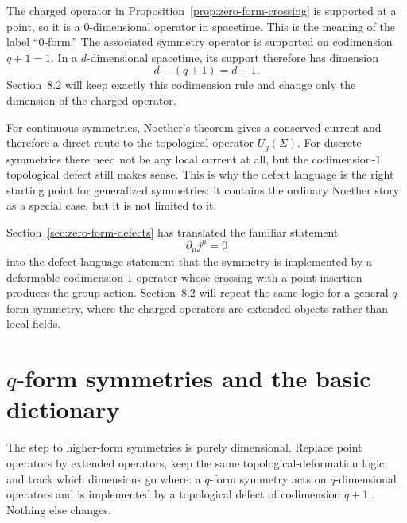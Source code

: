 \begin{remark}\label{rem:why-zero-form}
The charged operator in Proposition~\ref{prop:zero-form-crossing} is supported at a point, so it is a $0$-dimensional operator in spacetime. This is the meaning of the label ``$0$-form.'' The associated symmetry operator is supported on codimension $q+1=1$. In a $d$-dimensional spacetime, its support therefore has dimension
\begin{equation*}
d-(q+1)=d-1.
\end{equation*}
Section~8.2 will keep exactly this codimension rule and change only the dimension of the charged operator.
\end{remark}

\begin{remark}\label{rem:noether-vs-defect}
For continuous symmetries, Noether's theorem gives a conserved current and therefore a direct route to the topological operator $U_g(\Sigma)$. For discrete symmetries there need not be any local current at all, but the codimension-$1$ topological defect still makes sense. This is why the defect language is the right starting point for generalized symmetries: it contains the ordinary Noether story as a special case, but it is not limited to it.
\end{remark}

\begin{remark}\label{rem:zero-form-forward}
Section~\ref{sec:zero-form-defects} has translated the familiar statement
\begin{equation*}
\partial_\mu j^\mu = 0
\end{equation*}
into the defect-language statement that the symmetry is implemented by a deformable codimension-$1$ operator whose crossing with a point insertion produces the group action. Section~8.2 will repeat the same logic for a general $q$-form symmetry, where the charged operators are extended objects rather than local fields.
\end{remark}

\section{\texorpdfstring{$q$}{q}-form symmetries and the basic dictionary}\label{sec:qform-dictionary}

The step to higher-form symmetries is purely dimensional.  Replace point operators by extended operators, keep the same topological-deformation logic, and track which dimensions go where: a $q$-form symmetry acts on $q$-dimensional operators and is implemented by a topological defect of codimension $q+1$ \cite{GKSW2015,Bhardwaj2023Lectures}.  Nothing else changes.

